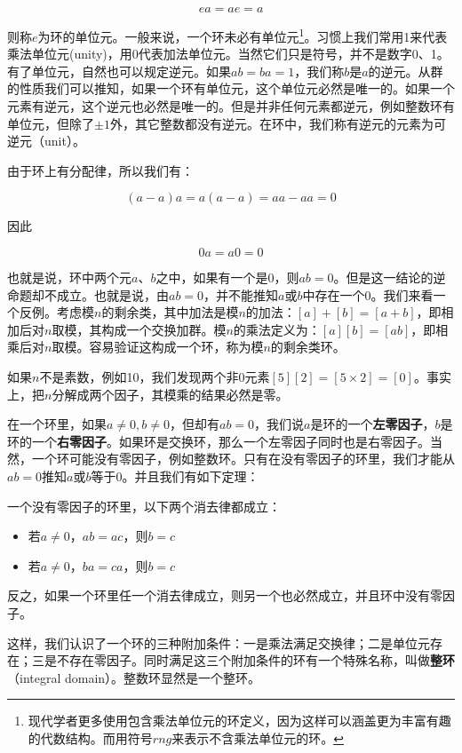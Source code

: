 \documentclass[b5paper]{ctexart}
\begin{document}
\[
ea = ae = a
\]

则称$e$为环的单位元。一般来说，一个环未必有单位元\footnote{现代学者更多使用包含乘法单位元的环定义，因为这样可以涵盖更为丰富有趣的代数结构。而用符号$rng$来表示不含乘法单位元的环。}。习惯上我们常用1来代表乘法单位元(unity)，用0代表加法单位元。当然它们只是符号，并不是数字0、1。有了单位元，自然也可以规定逆元。如果$ab = ba = 1$，我们称$b$是$a$的逆元。从群的性质我们可以推知，如果一个环有单位元，这个单位元必然是唯一的。如果一个元素有逆元，这个逆元也必然是唯一的。但是并非任何元素都逆元，例如整数环有单位元，但除了$\pm 1$外，其它整数都没有逆元。在环中，我们称有逆元的元素为可逆元（unit）。

由于环上有分配律，所以我们有：

\[
(a - a)a = a(a - a) = aa - aa = 0
\]

因此

\[
0 a = a 0 = 0
\]

也就是说，环中两个元$a$、$b$之中，如果有一个是0，则$ab = 0$。但是这一结论的逆命题却不成立。也就是说，由$ab = 0$，并不能推知$a$或$b$中存在一个0。我们来看一个反例。考虑模$n$的剩余类，其中加法是模$n$的加法：$[a] + [b] = [a + b]$，即相加后对$n$取模，其构成一个交换加群。模$n$的乘法定义为：$[a][b] = [ab]$，即相乘后对$n$取模。容易验证这构成一个环，称为模$n$的剩余类环。

如果$n$不是素数，例如10，我们发现两个非0元素$[5][2] = [5 \times 2] = [0]$。事实上，把$n$分解成两个因子，其模乘的结果必然是零。

在一个环里，如果$a \neq 0, b \neq 0$，但却有$ab = 0$，我们说$a$是环的一个\textbf{左零因子}，$b$是环的一个\textbf{右零因子}。如果环是交换环，那么一个左零因子同时也是右零因子。当然，一个环可能没有零因子，例如整数环。只有在没有零因子的环里，我们才能从$ab = 0$推知$a$或$b$等于0。并且我们有如下定理：

\begin{theorem}
一个没有零因子的环里，以下两个消去律都成立：
\begin{itemize}
\item 若$a \neq 0$，$ab = ac$，则$b = c$
\item 若$a \neq 0$，$ba = ca$，则$b = c$
\end{itemize}
\end{theorem}

反之，如果一个环里任一个消去律成立，则另一个也必然成立，并且环中没有零因子。

这样，我们认识了一个环的三种附加条件：一是乘法满足交换律；二是单位元存在；三是不存在零因子。同时满足这三个附加条件的环有一个特殊名称，叫做\textbf{整环}（integral domain）。整数环显然是一个整环。
\end{document}
